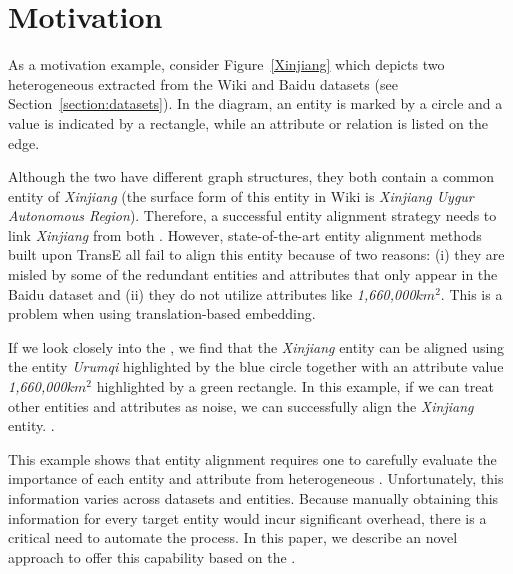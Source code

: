 \section{Motivation}
As a motivation example, consider Figure~\ref{Xinjiang} which depicts two heterogeneous \KGs extracted from the Wiki and Baidu datasets
(see Section~\ref{section:datasets}). In the diagram, an entity is marked by a circle and a value is indicated by a rectangle, while an
attribute or relation is listed on the edge.

Although the two \KGs have different graph structures, they both contain a common entity of \emph{Xinjiang} (the surface form of this
entity in Wiki is \emph{Xinjiang Uygur Autonomous Region}). Therefore, a successful entity alignment strategy needs to link \emph{Xinjiang}
from both \KGs. However, state-of-the-art entity alignment methods~\cite{hao2016joint,chen2016multilingual,sun2017cross,zhu2017iterative}
built upon TransE all fail to align this entity because of two reasons: (i) they are misled by some of the redundant entities and
attributes that only appear in the Baidu dataset and (ii) they do not utilize attributes like \emph{1,660,000$km^2$}. This is a problem
when using translation-based embedding.

If we look closely into the \KGs, we find that the \emph{Xinjiang} entity can be aligned using the entity \emph{Urumqi} highlighted by the
blue circle together with an attribute value \emph{1,660,000$km^2$} highlighted by a green rectangle. In this example, if we can treat
other entities and attributes as noise, we can successfully align the \emph{Xinjiang} entity. .

This example shows that entity alignment requires one to carefully evaluate the importance of each entity and attribute from heterogeneous
\KGs. Unfortunately, this information varies across datasets and entities. Because manually obtaining this information for every target
entity would incur significant overhead, there is a critical need to automate the process. In this paper, we describe an novel approach to
offer this capability based on the \RGCN.
